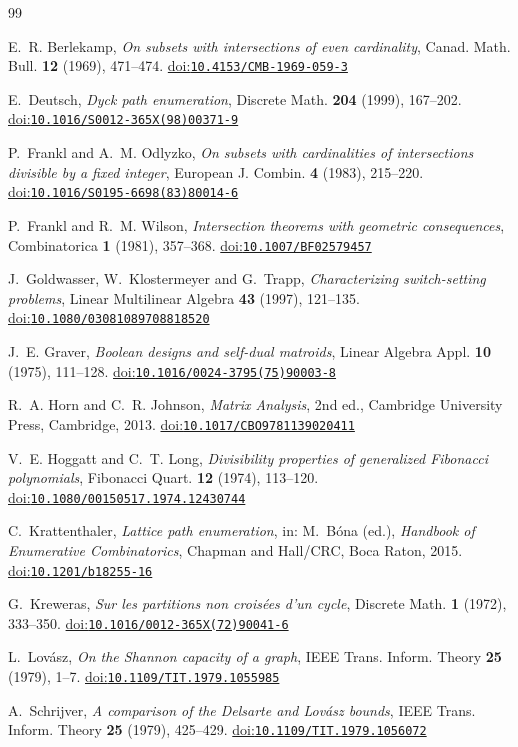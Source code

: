 \documentclass[11pt]{amsart}
\theoremstyle{definition}
\theoremstyle{remark}
\numberwithin{equation}{section}
\providecommand{\doi}[1]{\href{https://doi.org/#1}{doi:\nolinkurl{#1}}}
\begin{document}
\raggedbottom
\begin{thebibliography}{99}

E.~R. Berlekamp, \emph{On subsets with intersections of even cardinality}, Canad. Math. Bull. \textbf{12} (1969), 471--474. \doi{10.4153/CMB-1969-059-3}

E.~Deutsch, \emph{Dyck path enumeration}, Discrete Math. \textbf{204} (1999), 167--202. \doi{10.1016/S0012-365X(98)00371-9}

P.~Frankl and A.~M. Odlyzko, \emph{On subsets with cardinalities of intersections divisible by a fixed integer}, European J. Combin. \textbf{4} (1983), 215--220. \doi{10.1016/S0195-6698(83)80014-6}

P.~Frankl and R.~M. Wilson, \emph{Intersection theorems with geometric consequences}, Combinatorica \textbf{1} (1981), 357--368. \doi{10.1007/BF02579457}

J.~Goldwasser, W.~Klostermeyer and G.~Trapp, \emph{Characterizing switch-setting problems}, Linear Multilinear Algebra \textbf{43} (1997), 121--135. \doi{10.1080/03081089708818520}

J.~E. Graver, \emph{Boolean designs and self-dual matroids}, Linear Algebra Appl. \textbf{10} (1975), 111--128. \doi{10.1016/0024-3795(75)90003-8}

R.~A. Horn and C.~R. Johnson, \emph{Matrix Analysis}, 2nd ed., Cambridge University Press, Cambridge, 2013. \doi{10.1017/CBO9781139020411}

V.~E. Hoggatt and C.~T. Long, \emph{Divisibility properties of generalized Fibonacci polynomials}, Fibonacci Quart. \textbf{12} (1974), 113--120. \doi{10.1080/00150517.1974.12430744}

C.~Krattenthaler, \emph{Lattice path enumeration}, in: M.~B\'ona (ed.), \emph{Handbook of Enumerative Combinatorics}, Chapman and Hall/CRC, Boca Raton, 2015. \doi{10.1201/b18255-16}

G.~Kreweras, \emph{Sur les partitions non crois\'ees d'un cycle}, Discrete Math. \textbf{1} (1972), 333--350. \doi{10.1016/0012-365X(72)90041-6}

L.~Lov\'asz, \emph{On the Shannon capacity of a graph}, IEEE Trans. Inform. Theory \textbf{25} (1979), 1--7. \doi{10.1109/TIT.1979.1055985}

A.~Schrijver, \emph{A comparison of the Delsarte and Lov\'asz bounds}, IEEE Trans. Inform. Theory \textbf{25} (1979), 425--429. \doi{10.1109/TIT.1979.1056072}


\end{thebibliography}
\end{document}
